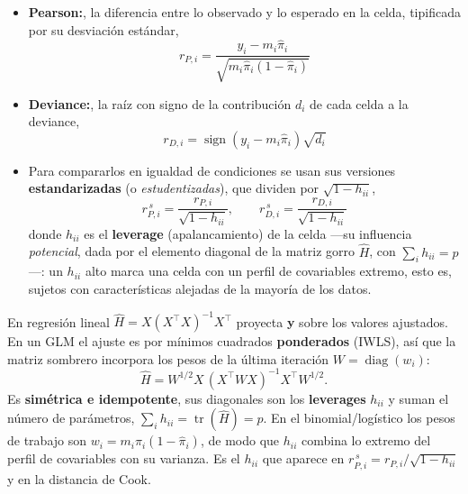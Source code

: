 \documentclass[
  letterpaper,
  DIV=11,
  numbers=noendperiod]{scrartcl}
\begin{document}
\begin{itemize}
\item
  \textbf{Pearson:}, la diferencia entre lo observado y lo esperado en
  la celda, tipificada por su desviación estándar,
  \[r_{P,i}=\dfrac{y_i-m_i\hat\pi_i}{\sqrt{m_i\hat\pi_i(1-\hat\pi_i)}}\]
\item
  \textbf{Deviance:}, la raíz con signo de la contribución \(d_i\) de
  cada celda a la deviance,
  \[r_{D,i}=\operatorname{sign}(y_i-m_i\hat\pi_i)\sqrt{d_i}\]
\item
  Para compararlos en igualdad de condiciones se usan sus versiones
  \textbf{estandarizadas} (o \emph{estudentizadas}), que dividen por
  \(\sqrt{1-h_{ii}}\), \[
  r^{\,s}_{P,i}=\frac{r_{P,i}}{\sqrt{1-h_{ii}}}, \qquad r^{\,s}_{D,i}=\frac{r_{D,i}}{\sqrt{1-h_{ii}}}
  \] donde \(h_{ii}\) es el \textbf{leverage} (apalancamiento) de la
  celda ---su influencia \emph{potencial}, dada por el elemento diagonal
  de la matriz gorro \(\hat H\), con \(\sum_i h_{ii}=p\)---: un
  \(h_{ii}\) alto marca una celda con un perfil de covariables extremo,
  esto es, sujetos con características alejadas de la mayoría de los
  datos.
\end{itemize}

\begin{tcolorbox}[enhanced jigsaw, coltitle=black, rightrule=.15mm, arc=.35mm, leftrule=.75mm, colback=white, colbacktitle=quarto-callout-note-color!10!white, left=2mm, breakable, toptitle=1mm, toprule=.15mm, bottomtitle=1mm, titlerule=0mm, title=\textcolor{quarto-callout-note-color}{\faInfo}\hspace{0.5em}{La matriz sombrero en un GLM}, bottomrule=.15mm, opacityback=0, opacitybacktitle=0.6, colframe=quarto-callout-note-color-frame]

En regresión lineal \(\hat H = X(X^{\top}X)^{-1}X^{\top}\) proyecta
\(\mathbf y\) sobre los valores ajustados. En un GLM el ajuste es por
mínimos cuadrados \textbf{ponderados} (IWLS), así que la matriz sombrero
incorpora los pesos de la última iteración
\(W=\operatorname{diag}(w_i)\): \[
\hat H = W^{1/2}X\,(X^{\top}WX)^{-1}X^{\top}W^{1/2}.
\] Es \textbf{simétrica e idempotente}, sus diagonales son los
\textbf{leverages} \(h_{ii}\) y suman el número de parámetros,
\(\sum_i h_{ii}=\operatorname{tr}(\hat H)=p\). En el binomial/logístico
los pesos de trabajo son \(w_i=m_i\hat\pi_i(1-\hat\pi_i)\), de modo que
\(h_{ii}\) combina lo extremo del perfil de covariables con su varianza.
Es el \(h_{ii}\) que aparece en
\(r^{\,s}_{P,i}=r_{P,i}/\sqrt{1-h_{ii}}\) y en la distancia de Cook.

\end{tcolorbox}
\end{document}
